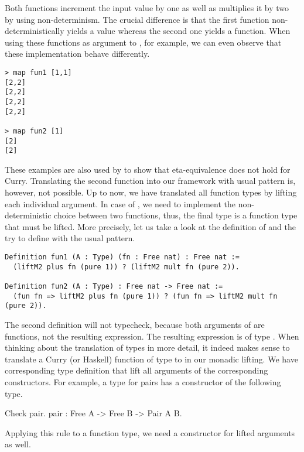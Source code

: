 Both functions increment the input value by one as well as multiplies it by two by using non-determinism.
The crucial difference is that the first function non-deterministically yields a value whereas the second one yields a function.
When using these functions as argument to , for example, we can even observe that these implementation behave differently.

\begin{verbatim}
> map fun1 [1,1]
[2,2]
[2,2]
[2,2]
[2,2]

> map fun2 [1]
[2]
[2]
\end{verbatim}

These examples are also used by \citet{mehner2014parametricity} to show that eta-equivalence does not hold for Curry.
Translating the second function into our framework with usual pattern is, however, not possible.
Up to now, we have translated all function types by lifting each individual argument.
In case of , we need to implement the non-deterministic choice between two functions, thus, the final type is a function type that must be lifted.
More precisely, let us take a look at the definition of  and the try to define  with the usual pattern.

\begin{verbatim}
Definition fun1 (A : Type) (fn : Free nat) : Free nat :=
  (liftM2 plus fn (pure 1)) ? (liftM2 mult fn (pure 2)).

Definition fun2 (A : Type) : Free nat -> Free nat :=
  (fun fn => liftM2 plus fn (pure 1)) ? (fun fn => liftM2 mult fn (pure 2)).
\end{verbatim}

The second definition will not typecheck, because both arguments of  are functions, not the resulting expression.
The resulting expression is of type .
When thinking about the translation of types in more detail, it indeed makes sense to translate a Curry (or Haskell) function of type  to  in our monadic lifting.
We have corresponding type definition that lift all arguments of the corresponding constructors.
For example, a type for pairs has a constructor  of the following type.

\begin{crepl}
\coqrepl Check pair.
  pair : Free A -> Free B -> Pair A B.
\end{crepl}

Applying this rule to a function type, we need a constructor for lifted arguments as well.

